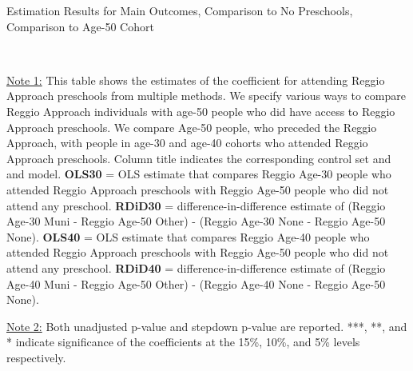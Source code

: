 \begin{table}[H] \caption{Estimation Results for Main Outcomes, Comparison to No Preschools, Comparison to Age-50 Cohort} \label{ols-M-adult50-reg-nopres}
\scalebox{0.56}{}
\vspace{1ex} \\
\footnotesize\raggedright{\underline{Note 1:} This table shows the estimates of the coefficient for attending Reggio Approach preschools from multiple methods. We specify various ways to compare Reggio Approach individuals with age-50 people who did have access to Reggio Approach preschools. We compare Age-50 people, who preceded the Reggio Approach, with people in age-30 and age-40 cohorts who attended Reggio Approach preschools. Column title indicates the corresponding control set and and model. \textbf{OLS30} = OLS estimate that compares Reggio Age-30 people who attended Reggio Approach preschools with Reggio Age-50 people who did not attend any preschool.  \textbf{RDiD30} = difference-in-difference estimate of (Reggio Age-30 Muni - Reggio Age-50 Other) - (Reggio Age-30 None - Reggio Age-50 None). \textbf{OLS40} = OLS estimate that compares Reggio Age-40 people who attended Reggio Approach preschools with Reggio Age-50 people who did not attend any preschool.  \textbf{RDiD40} = difference-in-difference estimate of (Reggio Age-40 Muni - Reggio Age-50 Other) - (Reggio Age-40 None - Reggio Age-50 None). }

\footnotesize\raggedright{\underline{Note 2:} Both unadjusted p-value and stepdown p-value are reported. ***, **, and * indicate significance of the coefficients at the 15\%, 10\%, and 5\% levels respectively.}
\end{table}

